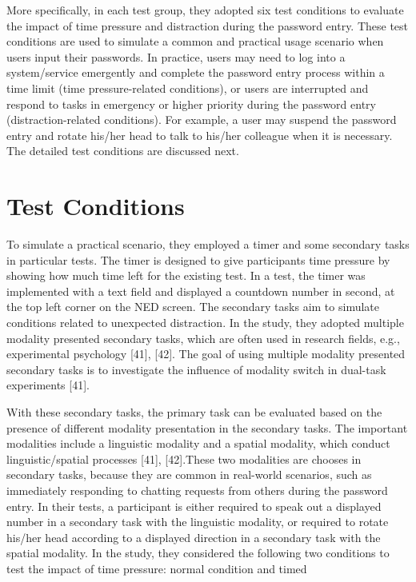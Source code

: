\documentclass[12pt,a4paper,oneside]{report}
\begin{document}
More specifically, in each test group, they adopted six test
conditions to evaluate the impact of time pressure and distraction during the password entry. These test conditions are used
to simulate a common and practical usage scenario when users
input their passwords. In practice, users may need to log into
a system/service emergently and complete the password entry
process within a time limit (time pressure-related conditions),
or users are interrupted and respond to tasks in emergency or
higher priority during the password entry (distraction-related
conditions). For example, a user may suspend the password
entry and rotate his/her head to talk to his/her colleague when
it is necessary. The detailed test conditions are discussed next.



\section{Test Conditions}
To simulate a practical scenario, they employed a timer
and some secondary tasks in particular tests. The timer is designed to give participants time pressure by showing how
much time left for the existing test. In a test, the timer was
implemented with a text field and displayed a countdown
number in second, at the top left corner on the NED screen.
The secondary tasks aim to simulate conditions related to
unexpected distraction. In the study, they adopted multiple
modality presented secondary tasks, which are often used in
research fields, e.g., experimental psychology [41], [42]. The
goal of using multiple modality presented secondary tasks is
to investigate the influence of modality switch in dual-task
experiments [41].
\par With these secondary tasks, the primary task can be evaluated based on the presence of different modality presentation
in the secondary tasks. The important modalities include a
linguistic modality and a spatial modality, which conduct
linguistic/spatial processes [41], [42].These two
modalities are chooses in secondary tasks, because they are common
in real-world scenarios, such as immediately responding to
chatting requests from others during the password entry. In their
tests, a participant is either required to speak out a displayed
number in a secondary task with the linguistic modality,
or required to rotate his/her head according to a displayed
direction in a secondary task with the spatial modality.
In the study, they considered the following two conditions to
test the impact of time pressure: normal condition and timed
\end{document}
